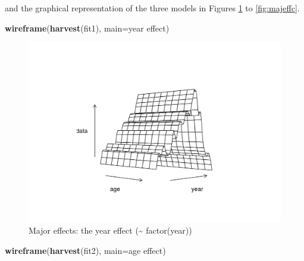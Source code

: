 \documentclass[
]{book}
\newenvironment{Shaded}{\begin{snugshade}}{\end{snugshade}}
\newcommand{\AttributeTok}[1]{\textcolor[rgb]{0.13,0.29,0.53}{#1}}
\newcommand{\FunctionTok}[1]{\textcolor[rgb]{0.13,0.29,0.53}{\textbf{#1}}}
\newcommand{\NormalTok}[1]{#1}
\newcommand{\StringTok}[1]{\textcolor[rgb]{0.31,0.60,0.02}{#1}}
\begin{document}
and the graphical representation of the three models in Figures \ref{fig:majeffy} to \ref{fig:majeffc}.

\begin{Shaded}
\begin{Highlighting}[]
\FunctionTok{wireframe}\NormalTok{(}\FunctionTok{harvest}\NormalTok{(fit1), }\AttributeTok{main=}\StringTok{\textquotesingle{}year effect\textquotesingle{}}\NormalTok{)}
\end{Highlighting}
\end{Shaded}

\begin{figure}
\centering
\includegraphics{_bookdown_files/_main_files/figure-html/majeffy-1.png}
\caption{\label{fig:majeffy}Major effects: the year effect (\textasciitilde{} factor(year))}
\end{figure}

\begin{Shaded}
\begin{Highlighting}[]
\FunctionTok{wireframe}\NormalTok{(}\FunctionTok{harvest}\NormalTok{(fit2), }\AttributeTok{main=}\StringTok{\textquotesingle{}age effect\textquotesingle{}}\NormalTok{)}
\end{Highlighting}
\end{Shaded}
\end{document}
